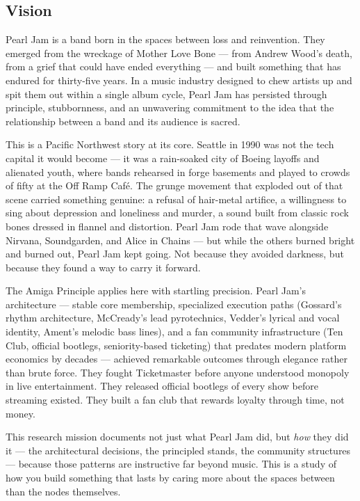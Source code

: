 \documentclass[11pt,letterpaper]{article}
\begin{document}
\subsection{Vision}

Pearl Jam is a band born in the spaces between loss and reinvention. They emerged from the wreckage of Mother Love Bone --- from Andrew Wood's death, from a grief that could have ended everything --- and built something that has endured for thirty-five years. In a music industry designed to chew artists up and spit them out within a single album cycle, Pearl Jam has persisted through principle, stubbornness, and an unwavering commitment to the idea that the relationship between a band and its audience is sacred.

This is a Pacific Northwest story at its core. Seattle in 1990 was not the tech capital it would become --- it was a rain-soaked city of Boeing layoffs and alienated youth, where bands rehearsed in forge basements and played to crowds of fifty at the Off Ramp Caf\'{e}. The grunge movement that exploded out of that scene carried something genuine: a refusal of hair-metal artifice, a willingness to sing about depression and loneliness and murder, a sound built from classic rock bones dressed in flannel and distortion. Pearl Jam rode that wave alongside Nirvana, Soundgarden, and Alice in Chains --- but while the others burned bright and burned out, Pearl Jam kept going. Not because they avoided darkness, but because they found a way to carry it forward.

The Amiga Principle applies here with startling precision. Pearl Jam's architecture --- stable core membership, specialized execution paths (Gossard's rhythm architecture, McCready's lead pyrotechnics, Vedder's lyrical and vocal identity, Ament's melodic bass lines), and a fan community infrastructure (Ten Club, official bootlegs, seniority-based ticketing) that predates modern platform economics by decades --- achieved remarkable outcomes through elegance rather than brute force. They fought Ticketmaster before anyone understood monopoly in live entertainment. They released official bootlegs of every show before streaming existed. They built a fan club that rewards loyalty through time, not money.

This research mission documents not just what Pearl Jam did, but \textit{how} they did it --- the architectural decisions, the principled stands, the community structures --- because those patterns are instructive far beyond music. This is a study of how you build something that lasts by caring more about the spaces between than the nodes themselves.
\end{document}
